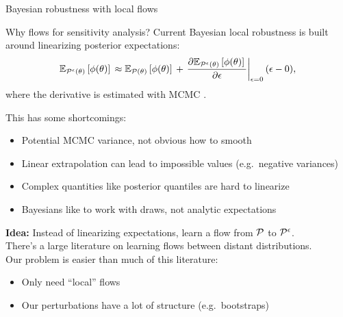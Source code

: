 
\begin{frame}[plain]
  \vfill
  \begin{block}{}
    \centering
    \Huge Bayesian robustness with local flows
  \end{block}
  \vfill
\end{frame}





\begin{frame}[t]{Why flows for sensitivity analysis?}
%
Current Bayesian local robustness is built around linearizing posterior expectations:
$$
\mathbb{E}_{\mathcal{P}^\epsilon(\theta)}\left[ \phi(\theta)\right]\, \approx
\mathbb{E}_{\mathcal{P}(\theta)}\left[ \phi(\theta)\right]\, +
\left. \frac{\partial \mathbb{E}_{\mathcal{P}^\epsilon(\theta)}\left[ \phi(\theta)\right]\,}{\partial \epsilon} \right|_{\epsilon = 0}(\epsilon - 0),
$$
%
where the derivative is estimated with MCMC
\parencite{gustafson:1996:localposterior,giordano:2018:covariances,cabral:2025:RobustnessModelChecking2025,dinoia:2025:LikelihoodDistortionBayesian2025,giordano:2026:mrplew}.

\pause
This has some shortcomings:
%
\begin{itemize}
\item Potential MCMC variance, not obvious how to smooth
\item Linear extrapolation can lead to impossible values (e.g.~negative variances)
\item Complex quantities like posterior quantiles are hard to linearize
\item Bayesians like to work with draws, not analytic expectations
  \parencite{han:2025:EfficientScenarioAnalysis2025}
\end{itemize}
%

\pause
\textbf{Idea:} Instead of linearizing expectations, learn a flow
from $\mathcal{P}$ to $\mathcal{P}^\epsilon$.\\[1em]

There's a large literature on learning flows between distant
distributions.  \parencite{papamakarios:2021:normalizingflows}\\
Our problem is easier than much of this literature:\\
%
\begin{itemize}
\item Only need ``local'' flows
\item Our perturbations have a lot of structure (e.g.~bootstraps)
\end{itemize}
%


\end{frame}



